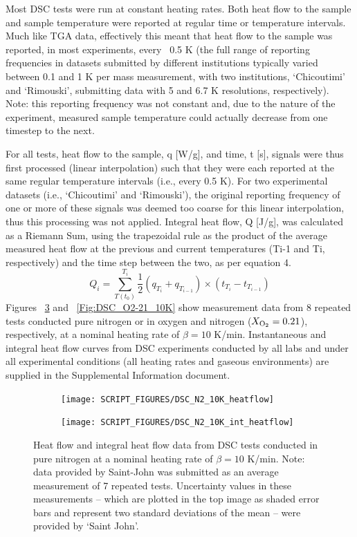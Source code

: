 \documentclass{book}
\begin{document}
Most DSC tests were run at constant heating rates. Both heat flow to the sample and sample temperature were reported at regular time or temperature intervals. Much like TGA data, effectively this meant that heat flow to the sample was reported, in most experiments, every ~0.5 K (the full range of reporting frequencies in datasets submitted by different institutions typically varied between 0.1 and 1 K per mass measurement, with two institutions, ‘Chicoutimi’ and ‘Rimouski’, submitting data with 5 and 6.7 K resolutions, respectively). Note: this reporting frequency was not constant and, due to the nature of the experiment, measured sample temperature could actually decrease from one timestep to the next.

For all tests, heat flow to the sample, q [W/g], and time, t [s], signals were thus first processed (linear interpolation) such that they were each reported at the same regular temperature intervals (i.e., every 0.5 K). For two experimental datasets (i.e., ‘Chicoutimi’ and ‘Rimouski’), the original reporting frequency of one or more of these signals was deemed too coarse for this linear interpolation, thus this processing was not applied. Integral heat flow, Q [J/g], was calculated as a Riemann Sum, using the trapezoidal rule as the product of the average measured heat flow at the previous and current temperatures (Ti-1 and Ti, respectively) and the time step between the two, as per equation 4.
\begin{equation}
Q_i=\sum_{T(t_0)}^{T_i}{\frac{1}{2}\left(q_{T_i}+q_{T_{i-1}}\right)\times\left(t_{T_i}-t_{T_{i-1}}\right)}
\end{equation}
Figures ~\ref{Fig:DSC_N2_10K} and ~\ref{Fig:DSC_O2-21_10K} show measurement data from 8 repeated tests conducted pure nitrogen or in oxygen and nitrogen ($X_{\rm O_2}=0.21$), respectively, at a nominal heating rate of $\beta=10$ K/min. Instantaneous and integral heat flow curves from DSC experiments conducted by all labs and under all experimental conditions (all heating rates and gaseous environments) are supplied in the Supplemental Information document.

\begin{figure}
\centering
\begin{subfigure}[b]{0.85\textwidth}
   \texttt{[image: SCRIPT\_FIGURES/DSC\_N2\_10K\_heatflow]}
   \caption{}
   \label{Fig:DSC_N2_10K_heatflow} 
\end{subfigure}

\begin{subfigure}[b]{0.85\textwidth}
   \texttt{[image: SCRIPT\_FIGURES/DSC\_N2\_10K\_int\_heatflow]}
   \caption{}
   \label{Fig:DSC_N2_10K_int_heatflow} 
\end{subfigure}
  
  \caption{Heat flow and integral heat flow data from DSC tests conducted in pure nitrogen at a nominal heating rate of $\beta=10$ K/min. Note: data provided by Saint-John was submitted as an average measurement of 7 repeated tests. Uncertainty values in these measurements – which are plotted in the top image as shaded error bars and represent two standard deviations of the mean – were provided by ‘Saint John’.}
  \label{Fig:DSC_N2_10K}
\end{figure}
\end{document}
